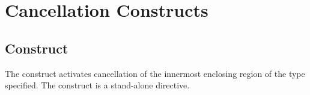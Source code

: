 %
%
%
%
%
%
%
%
%
%
%
%
%


\section{Cancellation Constructs}
\label{sec:Cancellation Constructs}
\subsection{ Construct}
\label{subsec:cancel Construct}
\summary
The  construct activates cancellation of the innermost enclosing 
region of the type specified. The  construct is a stand-alone directive.

